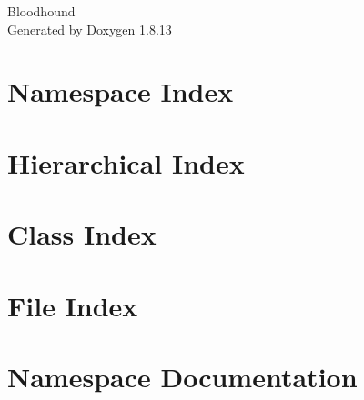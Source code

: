 \documentclass[twoside]{book}
\newcommand{\+}{\discretionary{\mbox{\scriptsize$\hookleftarrow$}}{}{}}
\newcommand{\clearemptydoublepage}{%
  \newpage{\pagestyle{empty}\cleardoublepage}%
}
\begin{document}
\hypersetup{pageanchor=false,
             bookmarksnumbered=true,
             pdfencoding=unicode
            }
\begin{titlepage}
\vspace*{7cm}
\begin{center}%
{\Large Bloodhound }\\
\vspace*{1cm}
{\large Generated by Doxygen 1.8.13}\\
\end{center}
\end{titlepage}
\clearemptydoublepage
{}
\tableofcontents
\clearemptydoublepage
{}
\hypersetup{pageanchor=true}

\chapter{Namespace Index}

\chapter{Hierarchical Index}

\chapter{Class Index}

\chapter{File Index}

\chapter{Namespace Documentation}




\end{document}

